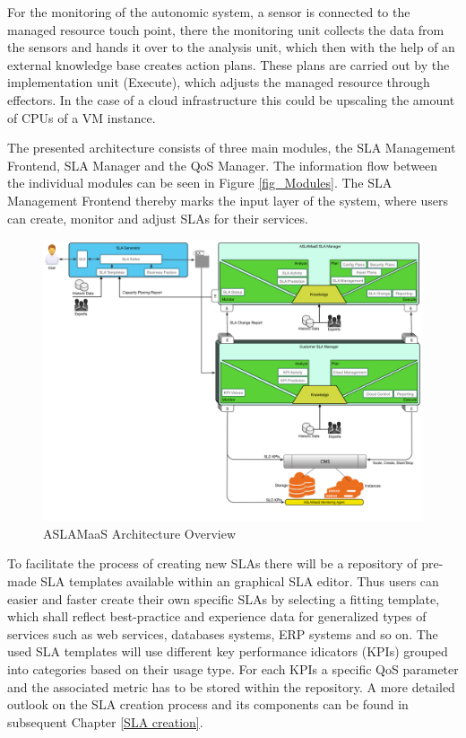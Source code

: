 For the monitoring of the autonomic system, a sensor is connected to the managed resource touch point, there the monitoring unit collects the data from the sensors and hands it over to the analysis unit, which then with the help of an external knowledge base creates action plans. These plans are carried out by the implementation unit (Execute), which adjusts the managed resource through effectors. In the case of a cloud infrastructure this could be upscaling the amount of CPUs of a VM instance.

The presented architecture consists of three main modules, the SLA Management Frontend, SLA Manager and the QoS Manager. The information flow between the individual modules can be seen in Figure \ref{fig_Modules}. The SLA Management Frontend thereby marks the input layer of the system, where users can create, monitor and adjust SLAs for their services.\\

\begin{figure}[!ht]
\centering
\includegraphics[width=5.3in]{chapters/chapter4/fig/ASLAMaaSArch.PNG}
\caption{ASLAMaaS Architecture Overview }
\label{fig_ASLAMaaSArch}
\end{figure}

To facilitate the process of creating new SLAs there will be a repository of pre-made SLA templates available within an graphical SLA editor. Thus users can easier and faster create their own specific SLAs by selecting a fitting template, which shall reflect best-practice and experience data for generalized types of services such as web services, databases systems, ERP systems and so on. The used SLA templates will use different key performance idicators (KPIs) grouped into categories based on their usage type. For each KPIs a specific QoS parameter and the associated metric has to be stored within the repository. A more detailed outlook on the SLA creation process and its components can be found in subsequent Chapter \ref{SLA creation}.


